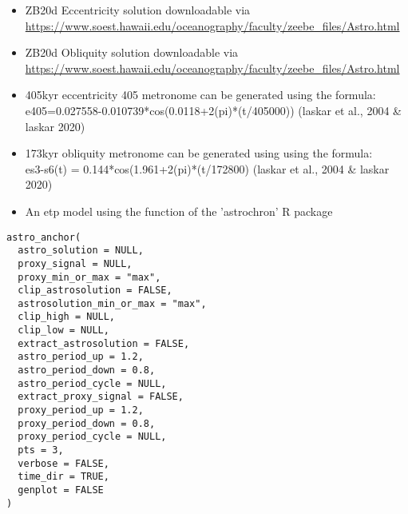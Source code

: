 \documentclass[a4paper]{book}
\begin{document}
\begin{Description}
\begin{itemize}
\item{} ZB20d Eccentricity solution downloadable via \url{https://www.soest.hawaii.edu/oceanography/faculty/zeebe_files/Astro.html}
\item{} ZB20d Obliquity solution downloadable via \url{https://www.soest.hawaii.edu/oceanography/faculty/zeebe_files/Astro.html}
\item{} 405kyr eccentricity 405 metronome can be generated using the formula:\\{}
e405=0.027558-0.010739*cos(0.0118+2(pi)*(t/405000)) (laskar et al., 2004 \& laskar 2020)
\item{} 173kyr obliquity  metronome can be generated using using the formula:\\{}
es3-s6(t) = 0.144*cos(1.961+2(pi)*(t/172800) (laskar et al., 2004 \& laskar 2020)
\item{} An etp model using the  function of the 'astrochron' R package

\end{itemize}

\end{Description}
%
\begin{Usage}
\begin{verbatim}
astro_anchor(
  astro_solution = NULL,
  proxy_signal = NULL,
  proxy_min_or_max = "max",
  clip_astrosolution = FALSE,
  astrosolution_min_or_max = "max",
  clip_high = NULL,
  clip_low = NULL,
  extract_astrosolution = FALSE,
  astro_period_up = 1.2,
  astro_period_down = 0.8,
  astro_period_cycle = NULL,
  extract_proxy_signal = FALSE,
  proxy_period_up = 1.2,
  proxy_period_down = 0.8,
  proxy_period_cycle = NULL,
  pts = 3,
  verbose = FALSE,
  time_dir = TRUE,
  genplot = FALSE
)
\end{verbatim}
\end{Usage}
%
\end{document}
